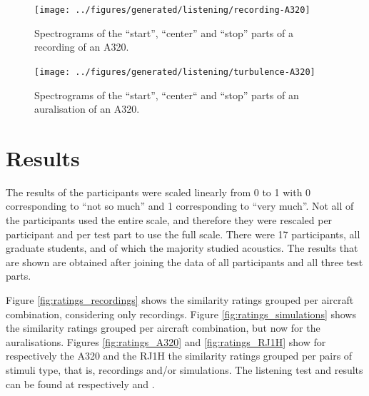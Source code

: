 \begin{figure}[H]
  \centering
  \texttt{[image: ../figures/generated/listening/recording-A320]}
  \caption{Spectrograms of the ``start'', ``center'' and ``stop'' parts of a recording of an A320.}
  \label{fig:listening:recording-A320}
\end{figure}

\begin{figure}[H]
  \centering
  \texttt{[image: ../figures/generated/listening/turbulence-A320]}
  \caption{Spectrograms of the ``start'', ``center`` and ``stop'' parts of an auralisation of an A320.}
  \label{fig:listening:simulation-A320}
\end{figure}

\section{Results}
The results of the participants were scaled linearly from 0 to 1 with 0
corresponding to ``not so much'' and 1 corresponding to ``very much''. Not all
of the participants used the entire scale, and therefore they were rescaled per
participant and per test part to use the full scale. There were 17 participants,
all graduate students, and of which the majority studied acoustics. The results
that are shown are obtained after joining the data of all participants and all
three test parts.


Figure \ref{fig:ratings_recordings} shows the similarity ratings grouped per
aircraft combination, considering only recordings. Figure
\ref{fig:ratings_simulations} shows the similarity ratings grouped per aircraft
combination, but now for the auralisations. Figures \ref{fig:ratings_A320} and
\ref{fig:ratings_RJ1H} show for respectively the A320 and the RJ1H the
similarity ratings grouped per pairs of stimuli type, that is, recordings and/or
simulations. The listening test and results can be found at respectively
\cite{Rietdijk2017a} and \cite{Rietdijk2017b}.


